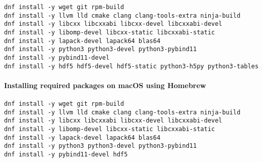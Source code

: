 \begin{verbatim}
dnf install -y wget git rpm-build
dnf install -y llvm lld cmake clang clang-tools-extra ninja-build
dnf install -y libcxx libcxxabi libcxx-devel libcxxabi-devel 
dnf install -y libomp-devel libcxx-static libcxxabi-static
dnf install -y lapack-devel lapack64 blas64
dnf install -y python3 python3-devel python3-pybind11
dnf install -y pybind11-devel
dnf install -y hdf5 hdf5-devel hdf5-static python3-h5py python3-tables
\end{verbatim}

\paragraph{Installing required packages on macOS using Homebrew}

\begin{verbatim}
dnf install -y wget git rpm-build
dnf install -y llvm lld cmake clang clang-tools-extra ninja-build
dnf install -y libcxx libcxxabi libcxx-devel libcxxabi-devel
dnf install -y libomp-devel libcxx-static libcxxabi-static
dnf install -y lapack-devel lapack64 blas64
dnf install -y python3 python3-devel python3-pybind11
dnf install -y pybind11-devel hdf5
\end{verbatim}


